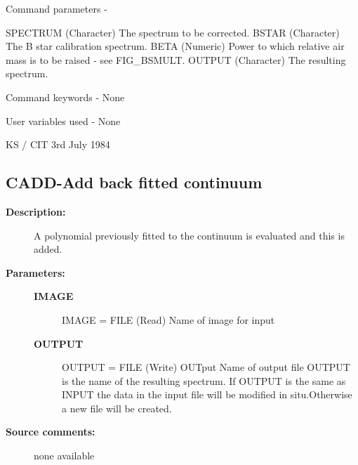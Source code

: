 \begin{description}
\begin{terminalv}
 Command parameters -

 SPECTRUM    (Character) The spectrum to be corrected.
 BSTAR       (Character) The B star calibration spectrum.
 BETA        (Numeric) Power to which relative air mass is
             to be raised - see FIG_BSMULT.
 OUTPUT      (Character) The resulting spectrum.

 Command keywords - None

 User variables used - None

                                     KS / CIT 3rd July 1984
\end{terminalv}
\end{description}
\subsection{CADD-\label{CADD}Add back fitted continuum}
\begin{description}

\item [\textbf{Description:}]
  A polynomial previously fitted to the continuum is evaluated and
  this is added.

\item [\textbf{Parameters:}]
\begin{description}
\item [\textbf{IMAGE}]
    IMAGE = FILE (Read)
        Name of image for input
\item [\textbf{OUTPUT}]
    OUTPUT = FILE (Write)
        OUTput Name of output file
        OUTPUT is the name of the resulting spectrum. If OUTPUT is the
        same as INPUT the data in the input file will be modified in
        situ.Otherwise a new file will be created.
\end{description}

\item [\textbf{Source comments:}]
\begin{terminalv}
  none available

\end{terminalv}
\end{description}
